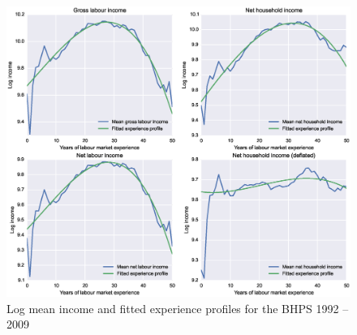 \begin{figure}
\includegraphics[width=\columnwidth]{BHPS_fitted_profiles}
\caption{Log mean income and fitted experience profiles for the BHPS 1992 
-- 2009}
\label{fig:bhps_profiles}
\end{figure}


